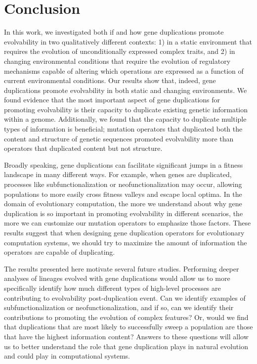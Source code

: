 \section{Conclusion} \label{sec:conclusion}

In this work, we investigated both if and how gene duplications promote evolvability in two qualitatively different contexts: 1) in a static environment that requires the evolution of unconditionally expressed complex traits, and 2) in changing environmental conditions that require the evolution of regulatory mechanisms capable of altering which operations are expressed as a function of current environmental conditions. %
Our results show that, indeed, gene duplications promote evolvability in both static and changing environments. We found evidence that the most important aspect of gene duplications for promoting evolvability is their capacity to duplicate existing genetic information within a genome.
Additionally, we found that the capacity to duplicate multiple types of information is beneficial; mutation operators that duplicated both the content and structure of genetic sequences promoted evolvability more than operators that duplicated content but not structure.

Broadly speaking, gene duplications can facilitate significant jumps in a fitness landscape in many different ways. For example, when genes are duplicated, processes like subfunctionalization or neofunctionalization may occur, allowing populations to more easily cross fitness valleys and escape local optima. In the domain of evolutionary computation, the more we understand about why gene duplication is so important in promoting evolvability in different scenarios, the more we can customize our mutation operators to emphasize those factors.
These results suggest that when designing gene duplication operators for evolutionary computation systems, we should try to maximize the amount of information the operators are capable of duplicating.

The results presented here motivate several future studies. Performing deeper analyses of lineages evolved with gene duplications would allow us to more specifically identify how much different types of high-level processes are contributing to evolvability post-duplication event. Can we identify examples of subfunctionalization or neofunctionalization, and if so, can we identify their contributions to promoting the evolution of complex features? Or, would we find that duplications that are most likely to successfully sweep a population are those that have the highest information content?  Answers to these questions will allow us to better understand the role that gene duplication plays in natural evolution and could play in computational systems.

